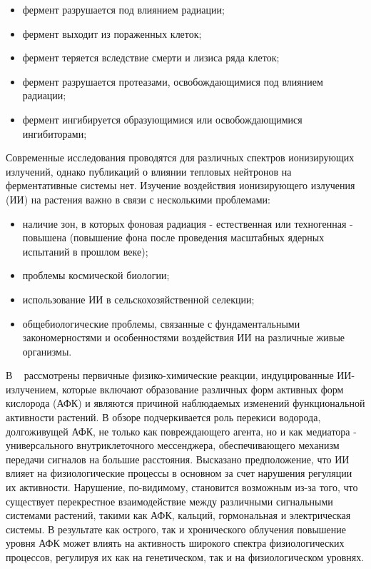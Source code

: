 \documentclass[11pt]{article}
\begin{document}
\begin{itemize} 
\item фермент разрушается под влиянием радиации; 
\item фермент выходит из пораженных клеток; 
\item фермент теряется вследствие смерти и лизиса ряда клеток;
\item фермент разрушается протеазами, освобождающимися под влиянием радиации;
\item фермент ингибируется образующимися или освобождающимися ингибиторами;
\end{itemize} 

Современные исследования проводятся для различных спектров ионизирующих излучений, однако публикаций о влиянии тепловых нейтронов на ферментативные системы нет. Изучение воздействия ионизирующего излучения (ИИ) на растения важно в связи с несколькими проблемами: 
\begin{itemize} 
\item наличие зон, в которых фоновая радиация - естественная или техногенная - повышена (повышение фона после проведения масштабных ядерных испытаний в прошлом веке); 
\item проблемы космической биологии; 
\item использование ИИ в сельскохозяйственной селекции;
\item общебиологические проблемы, связанные с фундаментальными закономерностями и особенностями воздействия ИИ на различные живые организмы.
\end{itemize} 

В ~\cite{Gudkov} рассмотрены первичные физико-химические реакции, индуцированные ИИ-излучением, которые включают образование различных форм активных форм кислорода (АФК) и являются причиной наблюдаемых изменений функциональной активности растений. В обзоре подчеркивается роль перекиси водорода, долгоживущей АФК, не только как повреждающего агента, но и как медиатора - универсального внутриклеточного мессенджера, обеспечивающего механизм передачи сигналов на большие расстояния. Высказано предположение, что ИИ влияет на физиологические процессы в основном за счет нарушения регуляции их активности. Нарушение, по-видимому, становится возможным из-за того, что существует перекрестное взаимодействие между различными сигнальными системами растений, такими как АФК, кальций, гормональная и электрическая системы. В результате как острого, так и хронического облучения повышение уровня АФК может влиять на активность широкого спектра физиологических процессов, регулируя их как на генетическом, так и на физиологическом уровнях. 
\end{document}
